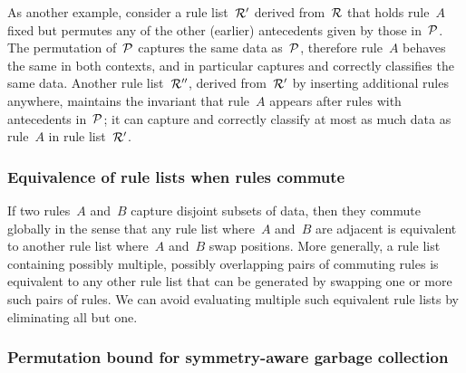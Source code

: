 As another example, consider a rule list~${\mathcal R}'$ derived from~${\mathcal R}$ that holds rule~$A$ fixed
but permutes any of the other (earlier) antecedents given by those in~${\mathcal P}$.
%
The permutation of~${\mathcal P}$ captures the same data as~${\mathcal P}$,
therefore rule~$A$ behaves the same in both contexts,
and in particular captures and correctly classifies the same data.
%
Another rule list~${\mathcal R}''$, derived from~${\mathcal R}'$ by inserting additional rules anywhere,
maintains the invariant that rule~$A$ appears after rules with antecedents in~${\mathcal P}$;
it can capture and correctly classify at most as much data as rule~$A$ in rule list~${\mathcal R}'$.
%

\subsubsection{Equivalence of rule lists when rules commute}

If two rules~$A$ and~$B$ capture disjoint subsets of data,
then they commute globally in the sense that any rule list where~$A$ and~$B$ are
adjacent is equivalent to another rule list where~$A$ and~$B$ swap positions.
%
More generally, a rule list containing possibly multiple, possibly overlapping
pairs of commuting rules is equivalent to any other rule list that can be generated
by swapping one or more such pairs of rules.
%
We can avoid evaluating multiple such equivalent rule lists by eliminating all but one.
%

\subsubsection{Permutation bound for symmetry-aware garbage collection}
\label{sec:permutation}

